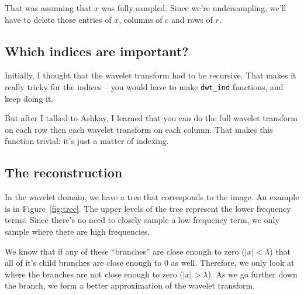 \documentclass{article}
\begin{document}
            That was assuming that $x$ was fully sampled. Since we're undersampling, we'll have to delete those entries of $x$, columns of $c$ and rows of $r$.


        \subsection{Which indices are important?}
            Initially, I thought that the wavelet transform had to be recursive. That makes it really tricky for the indices -- you would have to make \texttt{dwt\_ind} functions, and keep doing it. 

            But after I talked to Ashkay, I learned that you can do the full wavelet transform on each row then each wavelet transform on each column. That makes this function trivial: it's just a matter of indexing. 

        \subsection{The reconstruction}
            In the wavelet domain, we have a tree that corresponds to the image. An example is in Figure~\ref{fig:tree}. The upper levels of the tree represent the lower frequency terms. Since there's no need to closely sample a low frequency term, we only sample where there are high frequencies. 

            We know that if any of these ``branches'' are close enough to zero ($|x| < \lambda$) that all of it's child branches are close enough to 0 as well. Therefore, we only look at where the branches are not close enough to zero ($|x| > \lambda$). As we go further down the branch, we form a better approximation of the wavelet transform.
            
\end{document}
